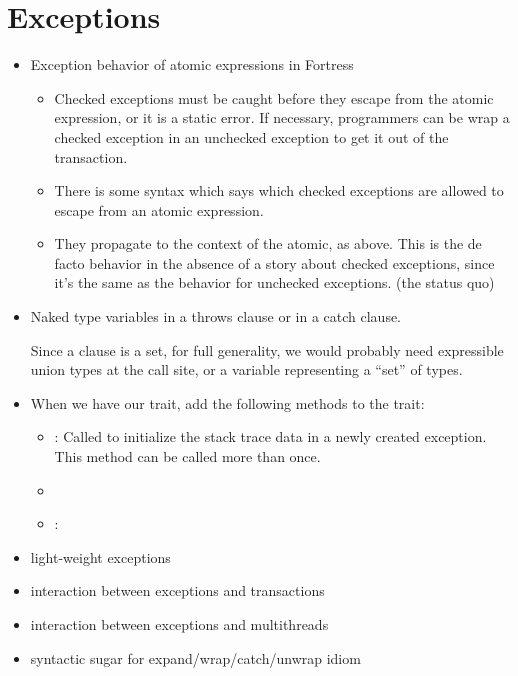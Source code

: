 \section{Exceptions}
\begin{itemize}
\item Exception behavior of atomic expressions in Fortress
  \begin{itemize}
  \item Checked exceptions must be caught before they escape from the atomic expression, or it is a static error.  If necessary, programmers can be wrap a checked exception in an unchecked exception to get it out of the transaction.
  \item There is some syntax which says which checked exceptions are allowed to escape from an atomic expression.
  \item They propagate to the context of the atomic, as above.  This is the de facto behavior in the absence of a story about checked exceptions, since it's the same as the behavior for unchecked exceptions. (the status quo)
  \end{itemize}
\item Naked type variables in a throws clause or in a catch clause.

Since a  clause is a set, for full generality, we would
probably need expressible union types at the call site,
or a variable representing a ``set'' of types.

\item When we have our  trait,
add the following methods to the  trait:
\begin{itemize}
\item {}:
Called to initialize the stack trace data in a newly created exception.
This method can be called more than once.
\item {}
\item {}:
\end{itemize}

\item light-weight exceptions
\item interaction between exceptions and transactions
\item interaction between exceptions and multithreads

\item syntactic sugar for expand/wrap/catch/unwrap idiom


\end{itemize}
